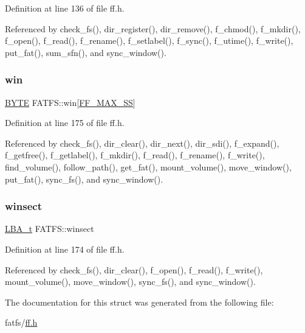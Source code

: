 Definition at line 136 of file ff.\+h.



Referenced by check\+\_\+fs(), dir\+\_\+register(), dir\+\_\+remove(), f\+\_\+chmod(), f\+\_\+mkdir(), f\+\_\+open(), f\+\_\+read(), f\+\_\+rename(), f\+\_\+setlabel(), f\+\_\+sync(), f\+\_\+utime(), f\+\_\+write(), put\+\_\+fat(), sum\+\_\+sfn(), and sync\+\_\+window().

\mbox{\label{structFATFS_a49e9c5c3ae9c13755242b6ce5748ecb1}} 
\subsubsection{\texorpdfstring{win}{win}}
{\footnotesize\ttfamily \hyperlink{ff_8h_a4ae1dab0fb4b072a66584546209e7d58}{B\+Y\+TE} F\+A\+T\+F\+S\+::win\mbox{[}\hyperlink{ffconf_8h_a104c36ee46f9d6e76dadf37f3d9696cc}{F\+F\+\_\+\+M\+A\+X\+\_\+\+SS}\mbox{]}}



Definition at line 175 of file ff.\+h.



Referenced by check\+\_\+fs(), dir\+\_\+clear(), dir\+\_\+next(), dir\+\_\+sdi(), f\+\_\+expand(), f\+\_\+getfree(), f\+\_\+getlabel(), f\+\_\+mkdir(), f\+\_\+read(), f\+\_\+rename(), f\+\_\+write(), find\+\_\+volume(), follow\+\_\+path(), get\+\_\+fat(), mount\+\_\+volume(), move\+\_\+window(), put\+\_\+fat(), sync\+\_\+fs(), and sync\+\_\+window().

\mbox{\label{structFATFS_aaf7eccaccdc9c4243230672d6b2f6566}} 
\subsubsection{\texorpdfstring{winsect}{winsect}}
{\footnotesize\ttfamily \hyperlink{ff_8h_a1f3c30a83148a28340f009d4e583f087}{L\+B\+A\+\_\+t} F\+A\+T\+F\+S\+::winsect}



Definition at line 174 of file ff.\+h.



Referenced by check\+\_\+fs(), dir\+\_\+clear(), f\+\_\+open(), f\+\_\+read(), f\+\_\+write(), mount\+\_\+volume(), move\+\_\+window(), sync\+\_\+fs(), and sync\+\_\+window().



The documentation for this struct was generated from the following file\+:\begin{DoxyCompactItemize}
\item 
fatfs/\hyperlink{ff_8h}{ff.\+h}\end{DoxyCompactItemize}
